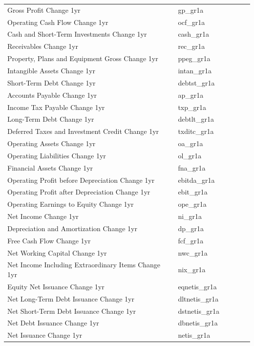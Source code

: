 \documentclass[12pt,title,fleqn]{article}
\begin{document}
\begin{longtable}{p{5cm}p{2cm}p{5cm}lll}
Gross Profit Change 1yr & gp\_gr1a & & & & \\
Operating Cash Flow Change 1yr & ocf\_gr1a & & & & \\
Cash and Short-Term Investments Change 1yr & cash\_gr1a & & & & \\
Receivables Change 1yr & rec\_gr1a & & & & \\
Property, Plans and Equipment Gross Change 1yr & ppeg\_gr1a & & & & \\
Intangible Assets Change 1yr & intan\_gr1a & & & & \\
Short-Term Debt Change 1yr & debtst\_gr1a & & & & \\
Accounts Payable Change 1yr & ap\_gr1a & & & & \\
Income Tax Payable Change 1yr & txp\_gr1a & & & & \\
Long-Term Debt Change 1yr & debtlt\_gr1a & & & & \\
Deferred Taxes and Investment Credit Change 1yr & txditc\_gr1a & & & & \\
Operating Assets Change 1yr & oa\_gr1a & & & & \\
Operating Liabilities Change 1yr & ol\_gr1a & & & & \\
Financial Assets Change 1yr & fna\_gr1a & & & & \\
Operating Profit before Depreciation Change 1yr & ebitda\_gr1a & & & & \\
Operating Profit after Depreciation Change 1yr & ebit\_gr1a & & & & \\
Operating Earnings to Equity Change 1yr & ope\_gr1a & & & & \\
Net Income Change 1yr & ni\_gr1a & & & & \\
Depreciation and Amortization Change 1yr & dp\_gr1a & & & & \\
Free Cash Flow Change 1yr & fcf\_gr1a & & & & \\
Net Working Capital Change 1yr & nwc\_gr1a & & & & \\
Net Income Including Extraordinary Items Change 1yr & nix\_gr1a & & & & \\
Equity Net Issuance Change 1yr & eqnetis\_gr1a & & & & \\
Net Long-Term Debt Issuance Change 1yr & dltnetis\_gr1a & & & & \\
Net Short-Term Debt Issuance Change 1yr & dstnetis\_gr1a & & & & \\
Net Debt Issuance Change 1yr & dbnetis\_gr1a & & & & \\
Net Issuance Change 1yr & netis\_gr1a & & & & \\

\end{longtable}
\end{document}
